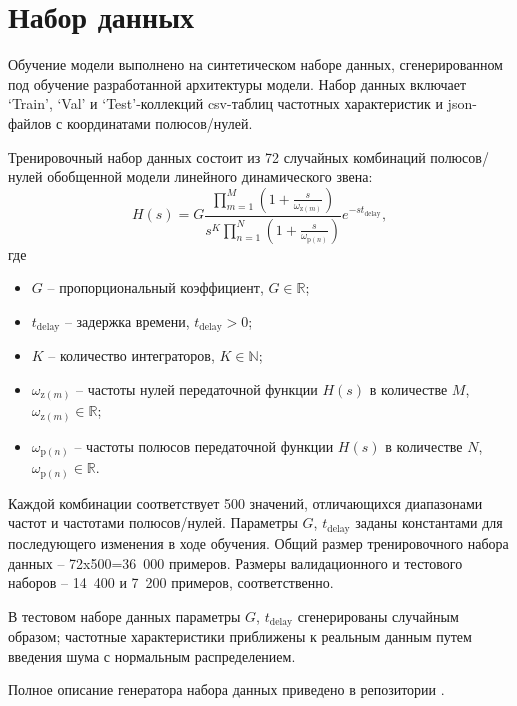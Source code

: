 \section{Набор данных}

Обучение модели выполнено на синтетическом наборе данных, сгенерированном под обучение разработанной архитектуры модели. Набор данных включает `Train', `Val' и `Test'-коллекций csv-таблиц частотных характеристик и json-файлов с координатами полюсов/нулей.

Тренировочный набор данных состоит из 72 случайных комбинаций полюсов/нулей обобщенной модели линейного динамического звена:
\begin{equation*}
    H(s) = G \frac{\prod\limits_{m=1}^{M} \left(1 + \frac{s}{\omega_{\text{z}(m)}} \right)}{s^K \prod\limits_{n=1}^{N} \left(1 + \frac{s}{\omega_{\text{p}(n)}}\right)} e^{-s t_\text{delay}},
\end{equation*}
где
\begin{itemize}
    \item ${G}$ -- пропорциональный коэффициент, ${G \in \mathbb{R}}$;
    \item ${t_\text{delay}}$ -- задержка времени, ${t_\text{delay}>0}$;
    \item ${K}$ -- количество интеграторов, ${K \in \mathbb{N}}$;
    \item ${\omega_{\text{z}(m)}}$ -- частоты нулей передаточной функции ${H(s)}$ в количестве ${M}$, ${\omega_{\text{z}(m)} \in \mathbb{R}}$;
    \item ${\omega_{\text{p}(n)}}$ -- частоты полюсов передаточной функции ${H(s)}$ в количестве ${N}$, ${\omega_{\text{p}(n)} \in \mathbb{R}}$.
\end{itemize}
Каждой комбинации соответствует 500 значений, отличающихся диапазонами частот и частотами полюсов/нулей. Параметры ${G}$, ${t_\text{delay}}$ заданы константами для последующего изменения в ходе обучения. Общий размер тренировочного набора данных -- 72x500=36~000 примеров. Размеры валидационного и тестового наборов -- 14~400 и 7~200 примеров, соответственно.

В тестовом наборе данных параметры ${G}$, ${t_\text{delay}}$ сгенерированы случайным образом; частотные характеристики приближены к реальным данным путем введения шума с нормальным распределением.

Полное описание генератора набора данных приведено в репозитории \cite{gorbunov2026zerospolesmasks}.
